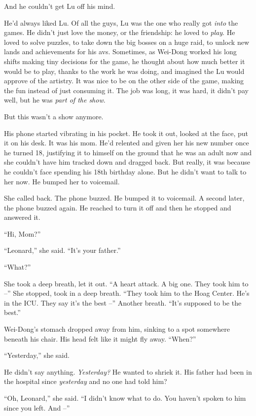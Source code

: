 And he couldn't get Lu off his mind.

He'd always liked Lu. Of all the guys, Lu was the one who really
got \emph{into} the games. He didn't just love the money, or the
friendship: he loved to \emph{play}. He loved to solve puzzles, to
take down the big bosses on a huge raid, to unlock new lands and
achievements for his avs. Sometimes, as Wei-Dong worked his long
shifts making tiny decisions for the game, he thought about how
much better it would be to play, thanks to the work he was doing,
and imagined the Lu would approve of the artistry. It was nice to
be on the other side of the game, making the fun instead of just
consuming it. The job was long, it was hard, it didn't pay well,
but he was \emph{part of the show}.

But this wasn't a show anymore.

His phone started vibrating in his pocket. He took it out, looked
at the face, put it on his desk. It was his mom. He'd relented and
given her his new number once he turned 18, justifying it to
himself on the ground that he was an adult now and she couldn't
have him tracked down and dragged back. But really, it was because
he couldn't face spending his 18th birthday alone. But he didn't
want to talk to her now. He bumped her to voicemail.

She called back. The phone buzzed. He bumped it to voicemail. A
second later, the phone buzzed again. He reached to turn it off and
then he stopped and answered it.

``Hi, Mom?''

``Leonard,'' she said. ``It's your father.''

``What?''

She took a deep breath, let it out. ``A heart attack. A big one.
They took him to --'' She stopped, took in a deep breath. ``They took
him to the Hoag Center. He's in the ICU. They say it's the best --''
Another breath. ``It's supposed to be the best.''

Wei-Dong's stomach dropped away from him, sinking to a spot
somewhere beneath his chair. His head felt like it might fly away.
``When?''

``Yesterday,'' she said.

He didn't say anything. \emph{Yesterday?} He wanted to shriek it.
His father had been in the hospital since \emph{yesterday} and no
one had told him?

``Oh, Leonard,'' she said. ``I didn't know what to do. You haven't
spoken to him since you left. And --''

